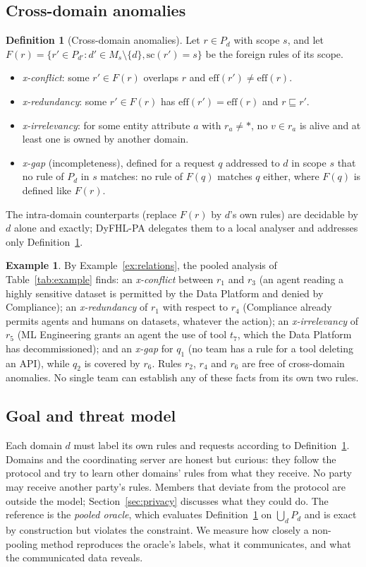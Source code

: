 \documentclass[preprint,12pt]{elsarticle}
\theoremstyle{definition}
\newtheorem{definition}{Definition}
\newtheorem{example}{Example}
\newcommand{\name}{DyFHL-PA\xspace}
\newcommand{\eff}{\mathrm{eff}}
\newcommand{\scp}{\mathrm{sc}}
\begin{document}
\subsection{Cross-domain anomalies}
\begin{definition}[Cross-domain anomalies]
\label{def:anom}
Let $r\in P_d$ with scope $s$, and let $F(r)=\{r'\in P_{d'}: d'\in M_s\setminus\{d\}, \scp(r')=s\}$ be the foreign rules of its scope.
\begin{itemize}
\item \emph{x-conflict}: some $r'\in F(r)$ overlaps $r$ and $\eff(r')\neq\eff(r)$.
\item \emph{x-redundancy}: some $r'\in F(r)$ has $\eff(r')=\eff(r)$ and $r\sqsubseteq r'$.
\item \emph{x-irrelevancy}: for some entity attribute $a$ with $r_a\neq\ast$, no $v\in r_a$ is alive and at least one is owned by another domain.
\item \emph{x-gap} (incompleteness), defined for a request $q$ addressed to $d$ in scope $s$ that no rule of $P_d$ in $s$ matches: no rule of $F(q)$ matches $q$ either, where $F(q)$ is defined like $F(r)$.
\end{itemize}
\end{definition}
The intra-domain counterparts (replace $F(r)$ by $d$'s own rules) are decidable by $d$ alone and exactly; \name delegates them to a local analyser and addresses only Definition~\ref{def:anom}.

\begin{example}
\label{ex:labels}
By Example~\ref{ex:relations}, the pooled analysis of Table~\ref{tab:example} finds: an \emph{x-conflict} between $r_1$ and $r_3$ (an agent reading a highly sensitive dataset is permitted by the Data Platform and denied by Compliance); an \emph{x-redundancy} of $r_1$ with respect to $r_4$ (Compliance already permits agents and humans on datasets, whatever the action); an \emph{x-irrelevancy} of $r_5$ (ML Engineering grants an agent the use of tool $t_7$, which the Data Platform has decommissioned); and an \emph{x-gap} for $q_1$ (no team has a rule for a tool deleting an API), while $q_2$ is covered by $r_6$. Rules $r_2$, $r_4$ and $r_6$ are free of cross-domain anomalies. No single team can establish any of these facts from its own two rules.
\end{example}

\subsection{Goal and threat model}
Each domain $d$ must label its own rules and requests according to Definition~\ref{def:anom}. Domains and the coordinating server are honest but curious: they follow the protocol and try to learn other domains' rules from what they receive. No party may receive another party's rules. Members that deviate from the protocol are outside the model; Section~\ref{sec:privacy} discusses what they could do. The reference is the \emph{pooled oracle}, which evaluates Definition~\ref{def:anom} on $\bigcup_d P_d$ and is exact by construction but violates the constraint. We measure how closely a non-pooling method reproduces the oracle's labels, what it communicates, and what the communicated data reveals.
\end{document}

